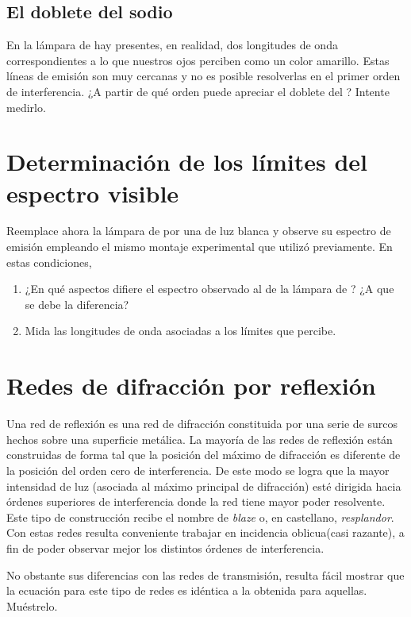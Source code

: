 \documentclass[laboratorio]{guia}
\begin{document}
        
\subsection{El doblete del sodio}
  En la lámpara de  hay presentes, en realidad, dos longitudes de onda correspondientes a lo que nuestros ojos perciben como un color amarillo.
  Estas líneas de emisión son muy cercanas y no es posible resolverlas en el primer orden de interferencia. 
  ¿A partir de qué orden puede apreciar el doblete del ? 
  Intente medirlo.



\section{Determinación de los límites del espectro visible}

Reemplace ahora la lámpara de  por una de luz blanca y observe su espectro de emisión empleando el mismo montaje experimental que utilizó previamente.
En estas condiciones, 
\begin{enumerate}
  \item 
¿En qué aspectos difiere el espectro observado al de la lámpara de ?
¿A que se debe la diferencia? 
  \item Mida las longitudes de onda asociadas a los límites que percibe.
\end{enumerate}


\section{Redes de difracción por reflexión}

Una red de reflexión es una red de difracción constituida por una serie de surcos hechos sobre una superficie metálica.
La mayoría de las redes de reflexión están construidas de forma tal que la posición del máximo de difracción es diferente de la posición del orden cero de interferencia.
De este modo se logra que la mayor intensidad de luz (asociada al máximo principal de difracción) esté dirigida hacia órdenes superiores de interferencia donde la red tiene mayor poder resolvente.
Este tipo de construcción recibe el nombre de \emph{blaze} o, en castellano, \emph{resplandor}.
Con estas redes resulta conveniente trabajar en incidencia oblicua(casi razante), a fin de poder observar mejor los distintos órdenes de interferencia. 

No obstante sus diferencias con las redes de transmisión, resulta fácil mostrar que la ecuación para este tipo de redes es idéntica a la obtenida para aquellas.
Muéstrelo. 
\end{document}
